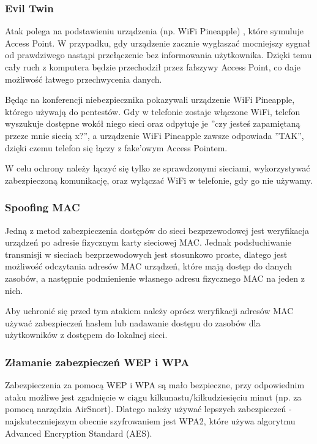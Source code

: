 \subsubsection{Evil Twin}

Atak polega na podstawieniu urządzenia (np. WiFi Pineapple) , które symuluje Access Point. W przypadku, gdy urządzenie zacznie wygłaszać mocniejszy sygnał od prawdziwego nastąpi przełączenie bez informowania użytkownika. Dzięki temu cały ruch z komputera będzie przechodził przez fałszywy Access Point, co daje możliwość łatwego przechwycenia danych.

Będąc na konferencji niebezpiecznika pokazywali urządzenie WiFi Pineapple, którego używają do pentestów. Gdy w telefonie zostaje włączone WiFi, telefon wyszukuje dostępne wokół niego sieci oraz odpytuje je ”czy jesteś zapamiętaną przeze mnie siecią x?”, a urządzenie WiFi Pineapple zawsze odpowiada ”TAK”, dzięki czemu telefon się łączy z fake’owym Access Pointem.

W celu ochrony należy łączyć się tylko ze sprawdzonymi sieciami, wykorzystywać zabezpieczoną komunikację, oraz wyłączać WiFi w telefonie, gdy go nie używamy.

\subsubsection{Spoofing MAC}

Jedną z metod zabezpieczenia dostępów do sieci bezprzewodowej jest weryfikacja urządzeń po adresie fizycznym karty sieciowej MAC. Jednak podsłuchiwanie transmisji w sieciach bezprzewodowych jest stosunkowo proste, dlatego jest możliwość odczytania adresów MAC urządzeń, które mają dostęp do danych zasobów, a następnie podmienienie własnego adresu fizycznego MAC na jeden z nich.

Aby uchronić się przed tym atakiem należy oprócz weryfikacji adresów MAC używać zabezpieczeń hasłem lub nadawanie dostępu do zasobów dla użytkowników z dostępem do lokalnej sieci.

\subsubsection{Złamanie zabezpieczeń WEP i WPA}

Zabezpieczenia za pomocą WEP i WPA są mało bezpieczne, przy odpowiednim ataku możliwe jest zgadnięcie w ciągu kilkunastu/kilkudziesięciu minut (np. za pomocą narzędzia AirSnort). Dlatego należy używać lepszych zabezpieczeń - najskuteczniejszym obecnie szyfrowaniem jest WPA2, które używa algorytmu Advanced Encryption Standard (AES).


